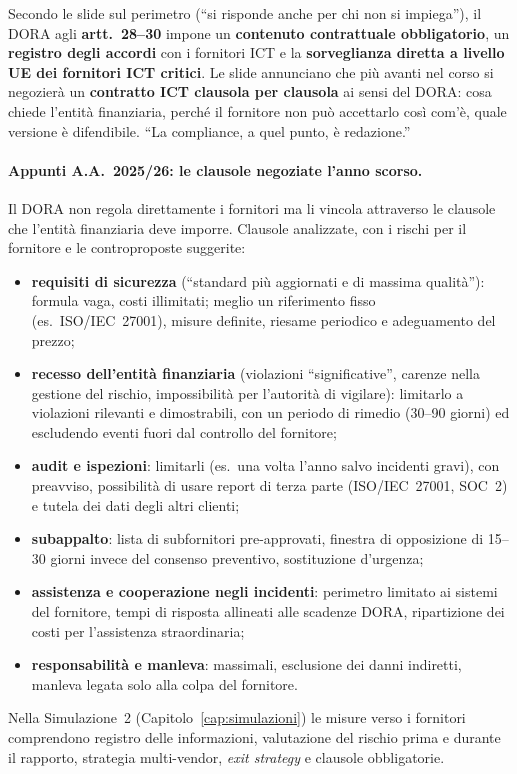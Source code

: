 Secondo le slide sul perimetro (``si risponde anche per chi non si impiega''), il DORA agli
\textbf{artt.~28--30} impone un \textbf{contenuto contrattuale obbligatorio}, un \textbf{registro degli
accordi} con i fornitori ICT e la \textbf{sorveglianza diretta a livello UE dei fornitori ICT critici}.
Le slide annunciano che più avanti nel corso si negozierà un \textbf{contratto ICT clausola per
clausola} ai sensi del DORA: cosa chiede l'entità finanziaria, perché il fornitore non può accettarlo
così com'è, quale versione è difendibile. ``La compliance, a quel punto, è redazione.''

\paragraph{Appunti A.A.~2025/26: le clausole negoziate l'anno scorso.} Il DORA non regola direttamente
i fornitori ma li vincola attraverso le clausole che l'entità finanziaria deve imporre. Clausole
analizzate, con i rischi per il fornitore e le controproposte suggerite:
\begin{itemize}
  \item \textbf{requisiti di sicurezza} (``standard più aggiornati e di massima qualità''): formula
    vaga, costi illimitati; meglio un riferimento fisso (es.\ ISO/IEC~27001), misure definite, riesame
    periodico e adeguamento del prezzo;
  \item \textbf{recesso dell'entità finanziaria} (violazioni ``significative'', carenze nella gestione
    del rischio, impossibilità per l'autorità di vigilare): limitarlo a violazioni rilevanti e
    dimostrabili, con un periodo di rimedio (30--90 giorni) ed escludendo eventi fuori dal controllo del
    fornitore;
  \item \textbf{audit e ispezioni}: limitarli (es.\ una volta l'anno salvo incidenti gravi), con
    preavviso, possibilità di usare report di terza parte (ISO/IEC~27001, SOC~2) e tutela dei dati
    degli altri clienti;
  \item \textbf{subappalto}: lista di subfornitori pre-approvati, finestra di opposizione di 15--30
    giorni invece del consenso preventivo, sostituzione d'urgenza;
  \item \textbf{assistenza e cooperazione negli incidenti}: perimetro limitato ai sistemi del
    fornitore, tempi di risposta allineati alle scadenze DORA, ripartizione dei costi per l'assistenza
    straordinaria;
  \item \textbf{responsabilità e manleva}: massimali, esclusione dei danni indiretti, manleva legata
    solo alla colpa del fornitore.
\end{itemize}
Nella Simulazione~2 (Capitolo~\ref{cap:simulazioni}) le misure verso i fornitori comprendono registro
delle informazioni, valutazione del rischio prima e durante il rapporto, strategia multi-vendor,
\emph{exit strategy} e clausole obbligatorie.

